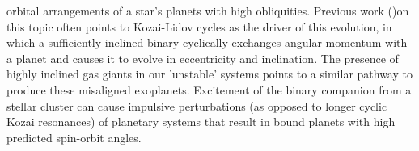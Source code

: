 \documentclass[manuscript]{aastex631}
\begin{document}
orbital arrangements of a star's planets with high obliquities. Previous work (\cite{fab07})on this topic often points to Kozai-Lidov cycles as the driver of this evolution, 
in which
a sufficiently inclined binary cyclically exchanges angular momentum with a planet and causes it to evolve in eccentricity and inclination.
The presence of highly inclined gas giants in our 'unstable' systems
points to a similar pathway to produce these misaligned exoplanets. Excitement of the binary companion from a stellar cluster
can cause impulsive perturbations (as opposed to longer cyclic Kozai resonances) of planetary systems that result in bound planets with 
high predicted spin-orbit angles.
\end{document}

